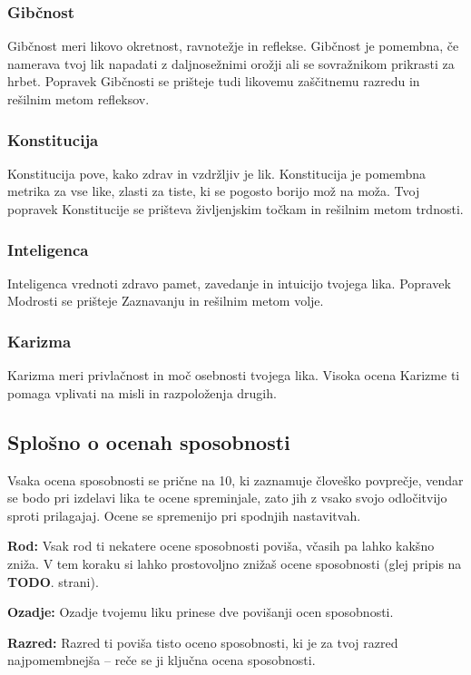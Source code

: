 \subsubsection{Gibčnost}
Gibčnost meri likovo okretnost, ravnotežje in reflekse. Gibčnost je pomembna, če namerava tvoj lik napadati z daljnosežnimi orožji ali se sovražnikom prikrasti za hrbet. Popravek Gibčnosti se prišteje tudi likovemu zaščitnemu razredu in rešilnim metom refleksov.

\subsubsection{Konstitucija}
Konstitucija pove, kako zdrav in vzdržljiv je lik. Konstitucija je pomembna metrika za vse like, zlasti za tiste, ki se pogosto borijo mož na moža. Tvoj popravek Konstitucije se prišteva življenjskim točkam in rešilnim metom trdnosti.

\subsubsection{Inteligenca}
Inteligenca vrednoti zdravo pamet, zavedanje in intuicijo tvojega lika. Popravek Modrosti se prišteje Zaznavanju in rešilnim metom volje.

\subsubsection{Karizma}
Karizma meri privlačnost in moč osebnosti tvojega lika. Visoka ocena Karizme ti pomaga vplivati na misli in razpoloženja drugih.

\subsection{Splošno o ocenah sposobnosti}
Vsaka ocena sposobnosti se prične na 10, ki zaznamuje človeško povprečje, vendar se bodo pri izdelavi lika te ocene spreminjale, zato jih z vsako svojo odločitvijo sproti prilagajaj. Ocene se spremenijo pri spodnjih nastavitvah.

\textbf{Rod:} Vsak rod ti nekatere ocene sposobnosti poviša, včasih pa lahko kakšno zniža. V tem koraku si lahko prostovoljno znižaš ocene sposobnosti (glej pripis na \textbf{TODO}. strani).

\textbf{Ozadje:} Ozadje tvojemu liku prinese dve povišanji ocen sposobnosti.

\textbf{Razred:} Razred ti poviša tisto oceno sposobnosti, ki je za tvoj razred najpomembnejša -- reče se ji ključna ocena sposobnosti.

